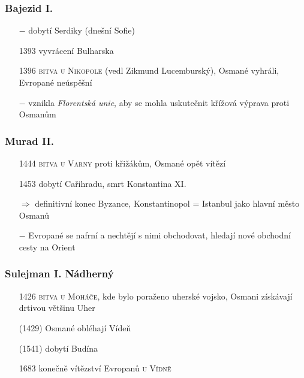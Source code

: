 \documentclass{article}
\begin{document}
\subsubsection*{Bajezid I.}
\begin{itemize}
    \vspace{-0.5em}
    \setlength\itemsep{0.15em}
    \item[$-$] dobytí Serdiky (dnešní Sofie)
    \item[1393] vyvrácení Bulharska
    \item[1396] \textsc{bitva u Nikopole} (vedl Zikmund Lucemburský), Osmané vyhráli, Evropané neúspěšní
    \item[$-$] vznikla \textit{Florentská unie}, aby se mohla uskutečnit křížová výprava proti Osmanům
\end{itemize}

\subsubsection*{Murad II.}
\begin{itemize}
    \vspace{-0.5em}
    \setlength\itemsep{0.15em}
    \item[1444] \textsc{bitva u Varny} proti křižákům, Osmané opět vítězí
\end{itemize}

\begin{itemize}
    \vspace{-0.5em}
    \setlength\itemsep{0.15em}
    \item[1453] dobytí Cařihradu, smrt Konstantina XI.
    \item[$\Rightarrow$] definitivní konec Byzance, Konstantinopol = Istanbul jako hlavní město Osmanů
    \item[$-$] Evropané se nafrní a nechtějí s nimi obchodovat, hledají nové obchodní cesty na Orient
\end{itemize}

\subsubsection*{Sulejman I. Nádherný}
\begin{itemize}
    \vspace{-0.5em}
    \setlength\itemsep{0.15em}
    \item[1426] \textsc{bitva u Moháče}, kde bylo poraženo uherské vojsko, Osmani získávají drtivou většinu Uher
    \item[(1429)] Osmané obléhají Vídeň
    \item[(1541)] dobytí Budína
    \item[1683] konečně vítězství Evropanů \textsc{u Vídně}
\end{itemize}
\end{document}
